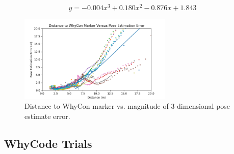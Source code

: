 \begin{equation}
    y=-0.004x^3+0.180x^2-0.876x+1.843
    \label{equation:whycon_error_regression}
\end{equation}

\begin{figure}[ht]
    \centering
    \includegraphics[width=0.65\textwidth]{images/whycon_pose_estimation_error.png}
    \caption{Distance to WhyCon marker vs. magnitude of 3-dimensional pose estimate error.}
    \label{fig:whycon_stationary_error}
\end{figure}



\subsection{WhyCode Trials}
\label{subsection:whycode_trials}


